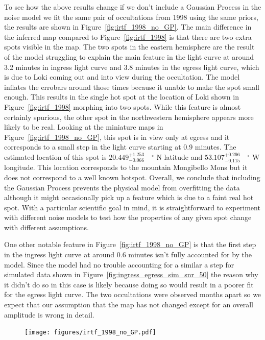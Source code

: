\documentclass[modern]{aastex62}
\begin{document}
To see how the above results change if we don't include a Gaussian Process in the noise model we fit the same pair of occultations from 1998 using the same priors, the results are shown in Figure~\ref{fig:irtf_1998_no_GP}.
The main difference in the inferred map compared to Figure~\ref{fig:irtf_1998} is that there are two extra spots visible in the map.
The two spots in the eastern hemisphere are the result of the model struggling to explain the main feature in the light curve at around 3.2 minutes in ingress light curve and 3.8 minutes in the egress light curve, which is due to  Loki coming out and into view during the occultation.
The model inflates the errobars around those times because it unable to make the spot small enough.
This results in the single hot spot at the location of Loki shown in Figure~\ref{fig:irtf_1998} morphing into two spots.
While this feature is almost certainly spurious, the other spot in the northwestern hemisphere appears more likely to be real.
Looking at the miniature maps in Figure~\ref{fig:irtf_1998_no_GP}, this spot is in view only at egress and it corresponds to a small step in the light curve starting at 0.9 minutes.
The estimated location of this spot is $20.449_{-0.066}^{+1.253}\quad^\circ$ N latitude and $53.107_{-0.115}^{+0.296}\quad^\circ$ W longitude.
This location corresponds to the mountain Mongibello Mons but it does not correspond to a well known hotspot.
Overall, we conclude that including the Gaussian Process prevents the physical model from overfitting the data although it might occasionally pick up a feature which is due to a faint real hot spot.
With a particular scientific goal in mind, it is straightforward to experiment with different noise models to test how the properties of any given spot change with different assumptions.


One other notable feature in Figure~\ref{fig:irtf_1998_no_GP} is that the first step in the ingress light curve at around 0.6 minutes isn't fully accounted for by the model.
Since the model had no trouble accounting for a similar a step for simulated data shown in Figure~\ref{fig:ingress_egress_sim_snr_50} the reason why it didn't do so in this case is likely because doing so would result in a poorer fit for the egress light curve.
The two occultations were observed months apart so we expect that our assumption that the map has not changed except for an overall amplitude is wrong in detail.  


\begin{figure}[t!]
    \begin{centering}
    \texttt{[image: figures/irtf\_1998\_no\_GP.pdf]}
    \end{centering}
\end{figure}
\end{document}
